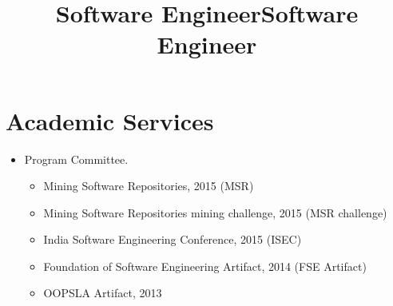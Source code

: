 \documentclass[overlapped,line,letterpaper, 12pt]{res}
\begin{document}
\begin{resume}
\vspace{-1cm}

\title{{Software Engineer}}%
\begin{position}
\end{position}

\vspace{-1cm}

\title{{Software Engineer}}%
\begin{position}
\end{position}

\section{\bf Academic Services}

\begin{itemize}
\item
Program Committee.
\begin{itemize}
\item
{\small Mining Software Repositories, 2015 (MSR)}
\item
{\small Mining Software Repositories mining challenge, 2015 (MSR challenge)}
\item
{\small India Software Engineering Conference, 2015 (ISEC)}
\item
{\small Foundation of Software Engineering Artifact, 2014 (FSE Artifact)}
\item
{\small  OOPSLA Artifact, 2013}
\end{itemize}


\end{itemize}
\end{resume}
\end{document}
